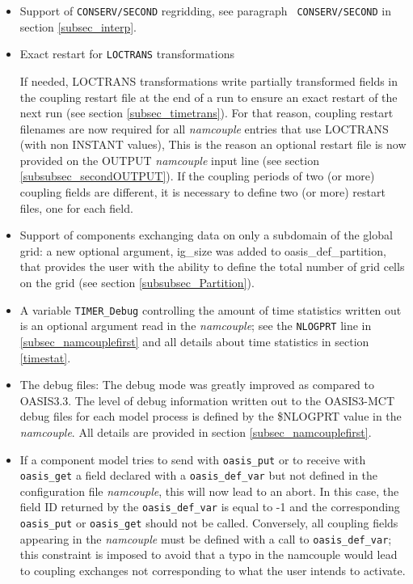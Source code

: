 \begin{itemize}
\item Support of {\tt CONSERV/SECOND} regridding, see paragraph {\tt
    CONSERV/SECOND} in section \ref{subsec_interp}.

\item Exact restart for {\tt LOCTRANS} transformations

If needed, LOCTRANS transformations write partially
  transformed fields  in the coupling restart file at the end of a run
  to ensure an exact restart of the next run (see section
  \ref{subsec_timetrans}). For that
  reason, coupling restart filenames are now required for all {\it
    namcouple} entries that use LOCTRANS (with non INSTANT
  values), This is the reason an optional restart file is now provided
  on the OUTPUT {\it namcouple} input line (see section
  \ref{subsubsec_secondOUTPUT}). 
If the coupling periods of
  two (or more) coupling fields are different, it is necessary to define 
  two (or more) restart files, one for each field.

\item Support of components exchanging data on only a subdomain of the
  global grid: a new optional argument, ig\_size was added to
  oasis\_def\_partition, that provides the user with the ability to
  define the total number of grid cells on the grid (see section
  \ref{subsubsec_Partition}).


\item A variable {\tt TIMER\_Debug} controlling the amount of time
  statistics written out is an optional argument read in the {\it
    namcouple}; see the {\tt NLOGPRT} line in
  \ref{subsec_namcouplefirst} and all details about time statistics in
  section \ref{timestat}.


\item The debug files: 
The debug mode was greatly improved as compared to OASIS3.3. The level
of debug information written out to the OASIS3-MCT debug files for
each model process is defined by the \$NLOGPRT value in the {\it
  namcouple}. All details are provided in section
\ref{subsec_namcouplefirst}.

\item If a
  component model tries to send with {\tt oasis\_put} or to receive
  with {\tt oasis\_get} a field declared
  with a {\tt oasis\_def\_var} but not defined in the configuration
  file {\it namcouple}, this will now lead to an abort. In this case,
  the field ID returned by the {\tt oasis\_def\_var} is equal to -1
  and the corresponding {\tt oasis\_put} or  {\tt oasis\_get} should not be
  called. Conversely, all coupling fields appearing in the {\it namcouple}
  must be defined with a call to {\tt oasis\_def\_var}; this constraint 
is imposed to avoid that a typo in the namcouple would lead to 
coupling exchanges not corresponding to what the user intends to activate.


\end{itemize}
